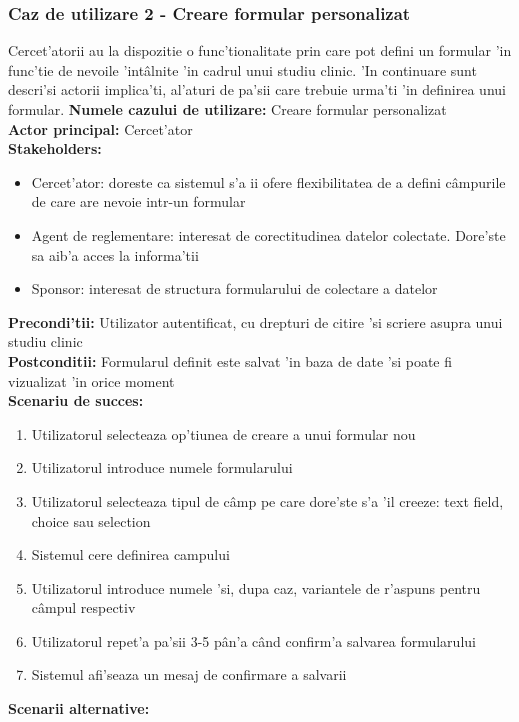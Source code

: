 \documentclass[12pt,a4paper,twoside]{report}
\begin{document}
\subsubsection{Caz de utilizare 2 - Creare formular personalizat}
Cercet'atorii au la dispozitie o func'tionalitate prin care pot defini un formular 'in func'tie de nevoile 'int\^alnite 'in cadrul unui studiu clinic. 'In continuare sunt descri'si actorii implica'ti, al'aturi de pa'sii care trebuie urma'ti 'in definirea unui formular.
\textbf{Numele cazului de utilizare:} Creare formular personalizat\\
\textbf{Actor principal:} Cercet'ator\\
\textbf{Stakeholders:}
\begin{itemize}
    \item Cercet'ator: doreste ca sistemul s'a ii ofere flexibilitatea de a defini c\^ampurile de care are nevoie intr-un formular
    \item Agent de reglementare: interesat de corectitudinea datelor colectate. Dore'ste sa aib'a acces la informa'tii
    \item Sponsor: interesat de structura formularului de colectare a datelor
\end{itemize}
\textbf{Precondi'tii:} Utilizator autentificat, cu drepturi de citire 'si scriere asupra unui studiu clinic\\
\textbf{Postconditii:} Formularul definit este salvat 'in baza de date 'si poate fi vizualizat 'in orice moment\\
\textbf{Scenariu de succes:} 
\begin{enumerate}
    \item Utilizatorul selecteaza op'tiunea de creare a unui formular nou
    \item Utilizatorul introduce numele formularului
    \item Utilizatorul selecteaza tipul de c\^amp pe care dore'ste s'a 'il creeze: text field, choice sau selection
    \item Sistemul cere definirea campului
    \item Utilizatorul introduce numele 'si, dupa caz, variantele de r'aspuns pentru c\^ampul respectiv
    \item Utilizatorul repet'a pa'sii 3-5 p\^an'a c\^and confirm'a salvarea formularului
    \item Sistemul afi'seaza un mesaj de confirmare a salvarii
\end{enumerate}
\textbf{Scenarii alternative:}
\end{document}

